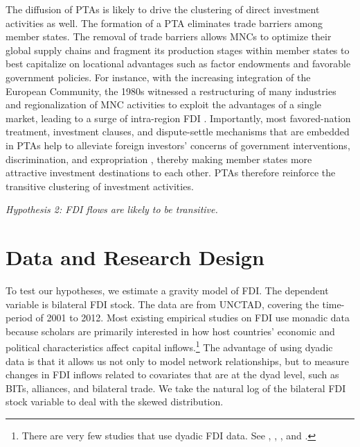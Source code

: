 \documentclass[reqno,onecolumn,letterpaper,12pt]{article}
\begin{document}
The diffusion of PTAs is likely to drive the clustering of direct investment activities as well. The formation of a PTA eliminates trade barriers among member states. The removal of trade barriers allows MNCs to optimize their global supply chains and fragment its production stages within member states to best capitalize on locational advantages such as factor endowments and favorable government policies. For instance, with the increasing integration of the European Community, the 1980s witnessed a restructuring of many industries and regionalization of MNC activities to exploit the advantages of a single market, leading to a surge of intra-region FDI \citep[34]{UNCTAD:1991}. Importantly, most favored-nation treatment, investment clauses, and dispute-settle mechanisms that are embedded in PTAs help to alleviate foreign investors' concerns of government interventions, discrimination, and expropriation \citep{Buthe_Milner:2008,buthe2014foreign}, thereby making member states more attractive investment destinations to each other. PTAs therefore reinforce the transitive clustering of investment activities.

\begin{center}
\textit{Hypothesis 2: FDI flows are likely to be transitive.}
\end{center}




\section{Data and Research Design}


To test our hypotheses, we estimate a gravity model of FDI. The dependent variable is bilateral FDI stock. The data are from UNCTAD, covering the time-period of 2001 to 2012. %
Most existing empirical studies on FDI use monadic data because scholars are primarily interested in how host countries' economic and political characteristics affect capital inflows.\footnote{There are very few studies that use dyadic FDI data. See \citet{Frenkel_et_al:2004}, \citet{Leblang:2010}, \citet{Li_Vashchilko:2010}, and \citet{Razin_et_al:2005}. } The advantage of using dyadic data is that it allows us not only to model network relationships, but to measure changes in FDI inflows related to covariates that are at the dyad level, such as BITs, alliances, and bilateral trade. We take the natural log of the bilateral FDI stock variable to deal with the skewed distribution.
\end{document}
